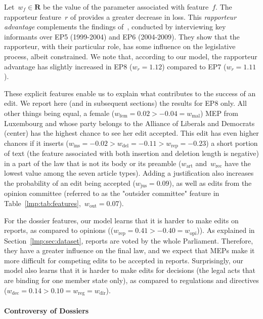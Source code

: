 Let~$w_f \in \mathbf{R}$ be the value of the parameter associated with feature~$f$.
The rapporteur feature~$r$ of  provides a greater decrease in loss.
This \textit{rapporteur advantage} complements the findings of~\citet{costello2010policy}, conducted by interviewing key informants over EP5 (1999-2004) and EP6 (2004-2009).
They show that the rapporteur, with their particular role, has some influence on the legislative process, albeit constrained.
We note that, according to our model, the rapporteur advantage has slightly increased in EP8 ($w_r=1.12$) compared to EP7 ($w_r=1.11$).

These explicit features enable us to explain what contributes to the success of an edit.
We report here (and in subsequent sections) the results for EP8 only.
All other things being equal, a female ($w_{\text{fem}}=0.02 > -0.04 = w_{\text{mal}}$) MEP from Luxembourg and whose party belongs to the Alliance of Liberals and Democrats (center) has the highest chance to see her edit accepted.
This edit has even higher chances if it inserts ($w_{\text{ins}}=-0.02 > w_{\text{del}}=-0.11 > w_{\text{rep}}=-0.23$) a short portion of text (the feature associated with both insertion and deletion length is negative) in a part of the law that is not its body or its preamble ($w_{\text{art}}$ and~$w_{\text{rec}}$ have the lowest value among the seven article types).
Adding a justification also increases the probability of an edit being accepted ($w_{\text{jus}}=0.09$), as well as edits from the opinion committee (referred to as the "outsider committee" feature in Table~\ref{lmp:tab:features},~$w_{\text{out}} =  0.07$).

For the dossier features, our model learns that it is harder to make edits on reports, as compared to opinions (($w_{\text{rep}}=0.41 > -0.40 = w_{\text{opi}}$)).
As explained in Section~\ref{lmp:sec:dataset}, reports are voted by the whole Parliament.
Therefore, they have a greater influence on the final law, and we expect that MEPs make it more difficult for competing edits to be accepted in reports.
Surprisingly, our model also learns that it is harder to make edits for decisions (the legal acts that are binding for one member state only), as compared to regulations and directives ($w_{\text{dec}}=0.14 > 0.10 = w_{\text{reg}} = w_{\text{dir}}$).

\paragraph{Controversy of Dossiers}

